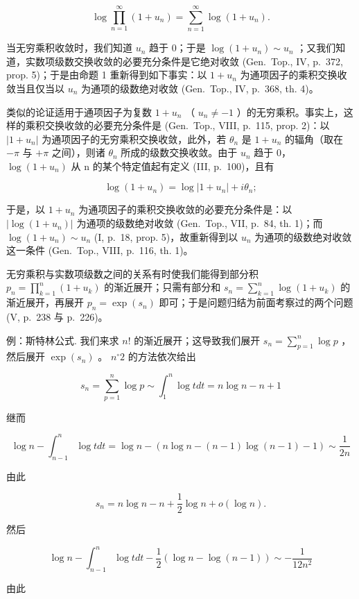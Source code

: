 \[
\log \prod_ {n = 1} ^ {\infty} (1 + u _ {n}) = \sum_ {n = 1} ^ {\infty} \log (1 + u _ {n}).
\]

当无穷乘积收敛时，我们知道 \(u_{n}\) 趋于 0；于是 \(\log(1 + u_{n}) \sim u_{n}\) ；又我们知道，实数项级数交换收敛的必要充分条件是它绝对收敛 (Gen.~Top., IV, p.~372, prop. 5)；于是由命题 1 重新得到如下事实：以 \(1 + u_{n}\) 为通项因子的乘积交换收敛当且仅当以 \(u_{n}\) 为通项的级数绝对收敛 (Gen.~Top., IV, p.~368, th. 4)。

类似的论证适用于通项因子为复数 \(1 + u_{n}\) （ \(u_{n} \neq -1\) ）的无穷乘积。事实上，这样的乘积交换收敛的必要充分条件是 (Gen.~Top., VIII, p.~115, prop. 2)：以 \(|1 + u_{n}|\) 为通项因子的无穷乘积交换收敛，此外，若 \(\theta_{n}\) 是 \(1 + u_{n}\) 的辐角（取在 \(-\pi\) 与 \(+\pi\) 之间），则诸 \(\theta_{n}\) 所成的级数交换收敛。由于 \(u_{n}\) 趋于 0， \(\log(1 + u_{n})\) 从 n 的某个特定值起有定义 (III, p.~100)，且有

\[
\log (1 + u _ {n}) = \log | 1 + u _ {n} | + i \theta_ {n};
\]

于是，以 \(1 + u_{n}\) 为通项因子的乘积交换收敛的必要充分条件是：以 \(|\log(1 + u_{n})|\) 为通项的级数绝对收敛 (Gen.~Top., VII, p.~84, th. 1)；而 \(\log(1 + u_{n}) \sim u_{n}\) (I, p.~18, prop. 5)，故重新得到以 \(u_{n}\) 为通项的级数绝对收敛这一条件 (Gen.~Top., VIII, p.~116, th. 1)。

无穷乘积与实数项级数之间的关系有时使我们能得到部分积 \(p_{n} = \prod_{k=1}^{n}(1 + u_{k})\) 的渐近展开；只需有部分和 \(s_{n} = \sum_{k=1}^{n} \log(1 + u_{k})\) 的渐近展开，再展开 \(p_{n} = \exp(s_{n})\) 即可；于是问题归结为前面考察过的两个问题 (V, p.~238 与 p.~226)。

例：斯特林公式. 我们来求 \(n!\) 的渐近展开；这导致我们展开 \(s_n = \sum_{p=1}^{n} \log p\) ，然后展开 \(\exp(s_n)\) 。 \(n^{\circ} 2\) 的方法依次给出

\[
s _ {n} = \sum_ {p = 1} ^ {n} \log p \sim \int_ {1} ^ {n} \log t d t = n \log n - n + 1
\]

继而

\[
\log n - \int_ {n - 1} ^ {n} \log t d t = \log n - (n \log n - (n - 1) \log (n - 1) - 1) \sim \frac {1}{2 n}
\]

由此

\[
s _ {n} = n \log n - n + \frac {1}{2} \log n + o (\log n).
\]

然后

\[
\log n - \int_ {n - 1} ^ {n} \log t d t - \frac {1}{2} (\log n - \log (n - 1)) \sim - \frac {1}{1 2 n ^ {2}}
\]

由此

